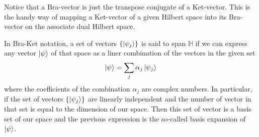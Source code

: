 \begin{flushleft}
    Notice that a Bra-vector is just the transpose conjugate of a Ket-vector. This is the handy way of mapping a Ket-vector of a given Hilbert space into its Bra-vector on the associate dual Hilbert space.
\end{flushleft}
\begin{corollary}
    In Bra-Ket notation, a set of vectors $\{\ket{\psi_{j}}\}$ is said to span $\mathbb{H}$ if we can express any vector $\ket{\psi}$ of that space as a liner combination of the vectors in the given set
    \begin{equation}
        \ket{\psi} = \sum_{j}\alpha_{j}\ket{\psi_{j}}
    \end{equation}
    where the coefficients of the combination $\alpha_{j}$ are complex numbers. In particular, if the set of vectors $\{\ket{\psi_{j}}\}$ are linearly independent and the number of vector in that set is equal to the dimension of our space. Then this set of vector is a basis set of our space and the previous expression is the so-called basis expansion of $\ket{\psi}$.
\end{corollary}
\begin{flushleft}
\end{flushleft}
